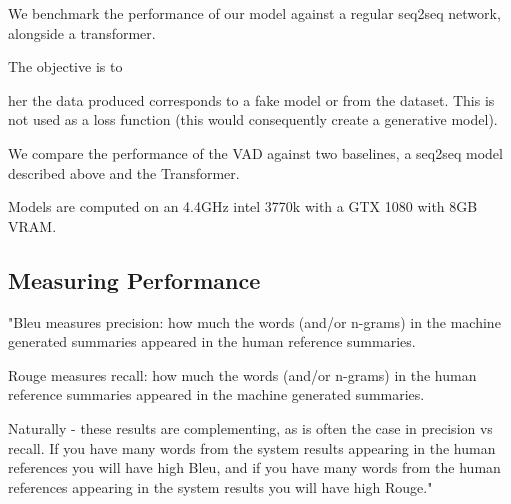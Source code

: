 \documentclass[12pt,twoside]{report}
\begin{document}
We benchmark the performance of our model against a regular seq2seq network, alongside a transformer. 

The objective is to 

her the data produced corresponds to a fake model or from the dataset. This is not used as a loss function (this would consequently create a generative model).

We compare the performance of the VAD against two baselines, a seq2seq model described above and the Transformer.

Models are computed on an 4.4GHz intel 3770k with a GTX 1080 with 8GB VRAM.


\subsection{Measuring Performance}

"Bleu measures precision: how much the words (and/or n-grams) in the machine generated summaries appeared in the human reference summaries.

Rouge measures recall: how much the words (and/or n-grams) in the human reference summaries appeared in the machine generated summaries.

Naturally - these results are complementing, as is often the case in precision vs recall. If you have many words from the system results appearing in the human references you will have high Bleu, and if you have many words from the human references appearing in the system results you will have high Rouge."








 
\end{document}
